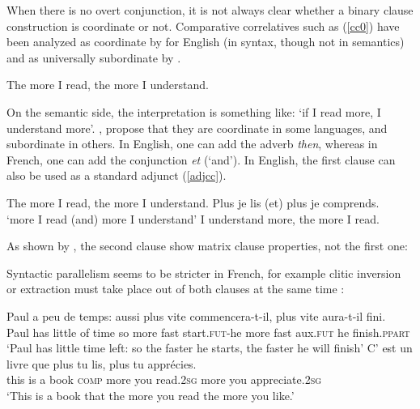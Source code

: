 \documentclass[output=paper]{langsci/langscibook}
\begin{document}
When there is no overt conjunction, it is not always clear whether a binary clause construction is coordinate or not. Comparative correlatives such as (\ref{cc0}) have been analyzed as coordinate by \citet{culijack} for English (in syntax, though not in semantics) and as universally subordinate  by \citet{dikken}. 

\begin{exe}
\ex The more I read, the more I understand. \label{cc0}
\end{exe}

On the semantic side, the interpretation is something like: `if I read more, I understand more'. \citet{Abeille:06}, \citet{Abeille:Borsley:08} propose that they are  coordinate in some languages, 
 and subordinate in others. In English, one can add the adverb \emph{then}, whereas in French, one can add the conjunction \emph{et} (`and'). In English, the first clause can also be used as a standard adjunct (\ref{adjcc}).
 
 
 
 \begin{exe}
 \ex
\begin{xlista}
\ex The more I read,  the more I understand.
\ex Plus je lis (et) plus je comprends.\\
`more I read (and) more I understand'
\ex I understand more, the more I read.
\end{xlista}\label{adjcc}
\end{exe}

As shown by \citet[549-550]{culijack}, the second clause show matrix clause properties, not the first one:

\begin{exe}
 \ex
\begin{xlista}
\end{xlista}
\end{exe}

Syntactic parallelism seems to be stricter in French, for example clitic inversion or extraction must take place out of both clauses at the same time \citep{Abeille:Borsley:08}:

\begin{exe}
 \ex
\begin{xlista}
\ex \gll Paul a     peu  de temps: aussi plus  vite commencera-t-il,  plus   vite  aura-t-il  fini.\\
Paul has little of time so more fast start.\textsc{fut}-he more fast  aux.\textsc{fut} he finish.\textsc{ppart} \\
\glt `Paul has little time left: so the faster he starts, the faster he will finish'
\ex \gll C'   est un livre  que      plus   tu    lis, plus  tu    appr\'{e}cies. \\
this is    a  book \textsc{comp} more you read.2\textsc{sg}  more you appreciate.2\textsc{sg} \\
\glt `This is a book that the more you read the more you like.'
\end{xlista}
\end{exe}
\end{document}
